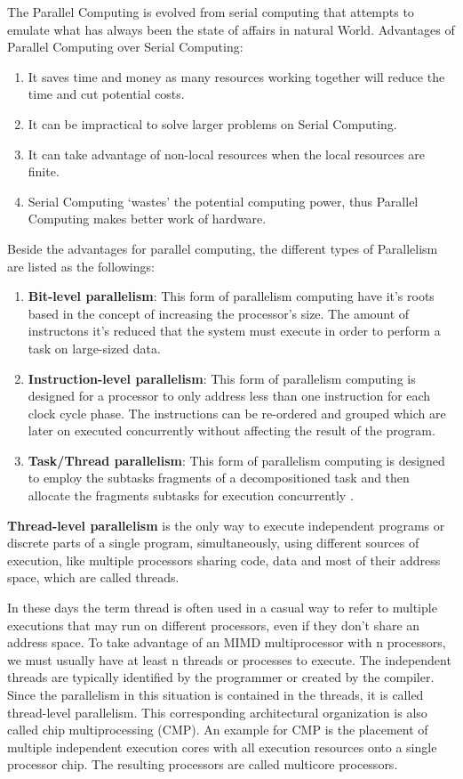 The Parallel Computing is evolved from serial computing that attempts to emulate what has always been the state of affairs in natural World.
Advantages of Parallel Computing over Serial Computing:
\begin{enumerate}
			\item {It saves time and money as many resources working together will reduce the time and cut potential costs.}
			\item {It can be impractical to solve larger problems on Serial Computing.}
			\item {It can take advantage of non-local resources when the local resources are finite.}
			\item {Serial Computing ‘wastes’ the potential computing power, thus Parallel Computing makes better work of hardware.}
\end{enumerate}

\noindent Beside the advantages for parallel computing, the different types of Parallelism are listed as the followings:

\begin{enumerate}
	 \item {\textbf{Bit-level parallelism}: This form of parallelism computing have it's roots based in the concept of increasing the processor's size. The amount of instructons it's reduced that the system must execute in order to perform a task on large-sized data.}
	 \item {\textbf{Instruction-level parallelism}: This form of parallelism computing is designed for a processor to only address less than one instruction for each clock cycle phase. The instructions can be re-ordered and grouped which are later on executed concurrently without affecting the result of the program.}
	  \item {\textbf{Task/Thread parallelism}: This form of parallelism computing is designed to employ the subtasks fragments of a decompositioned task and then allocate the fragments subtasks for execution concurrently} \parencite{book7}.
\end{enumerate}   

\noindent \textbf{Thread-level parallelism} is the only way to execute independent programs or discrete parts of a single program, simultaneously, using different sources of execution, like multiple processors sharing code, data and most of their address space, which are called threads.
 
In these days the term thread is often used in a casual way to refer to multiple executions that may run on different processors, even if they don't share an address space. To take advantage of an MIMD multiprocessor with n processors, we must usually have at least n threads or processes to execute. The independent threads are typically identified by the programmer or created by the compiler. Since the parallelism in this situation is contained in the threads, it is called thread-level parallelism. This corresponding architectural organization is also called chip multiprocessing (CMP). An example for CMP is the placement of multiple independent execution cores with all execution resources onto a single processor chip. The resulting processors are called multicore processors.

